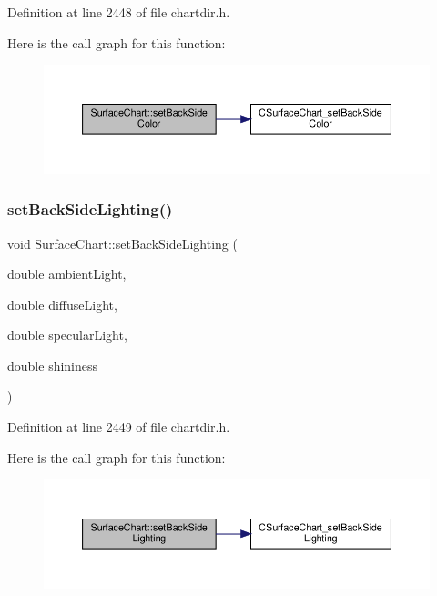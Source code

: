 Definition at line 2448 of file chartdir.\+h.

Here is the call graph for this function\+:
\nopagebreak
\begin{figure}[H]
\begin{center}
\leavevmode
\includegraphics[width=350pt]{class_surface_chart_a94b772a2242149700813a53810bb437d_cgraph}
\end{center}
\end{figure}
\mbox{\label{class_surface_chart_ae77d941a6c2a2d62c60cc2d3cc5f6f6b}} 
\subsubsection{\texorpdfstring{set\+Back\+Side\+Lighting()}{setBackSideLighting()}}
{\footnotesize\ttfamily void Surface\+Chart\+::set\+Back\+Side\+Lighting (\begin{DoxyParamCaption}\item[{double}]{ambient\+Light,  }\item[{double}]{diffuse\+Light,  }\item[{double}]{specular\+Light,  }\item[{double}]{shininess }\end{DoxyParamCaption})\hspace{0.3cm}{\ttfamily [inline]}}



Definition at line 2449 of file chartdir.\+h.

Here is the call graph for this function\+:
\nopagebreak
\begin{figure}[H]
\begin{center}
\leavevmode
\includegraphics[width=350pt]{class_surface_chart_ae77d941a6c2a2d62c60cc2d3cc5f6f6b_cgraph}
\end{center}
\end{figure}
\mbox{\label{class_surface_chart_afd3357880657ab5b2301c4a3c7d233bb}} 
